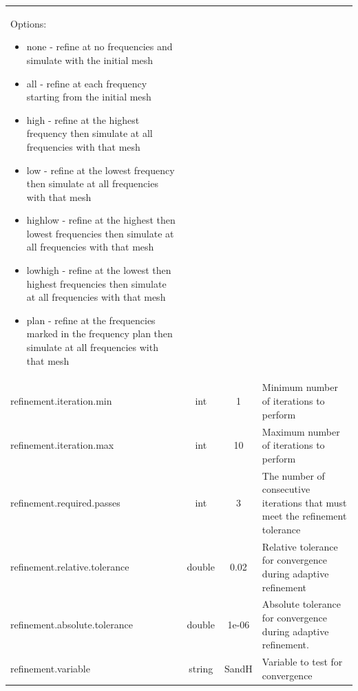 \documentclass[titlepage]{article}
\renewcommand\_{\textunderscore\linebreak[1]}
\begin{document}
\begin{longtable}[c]{|lccp{8cm}|}
                                                   Options: 
                                                   \begin{itemize}[nosep]
                                                     \item none    - refine at no frequencies and simulate with the initial mesh
                                                     \item all     - refine at each frequency starting from the initial mesh
                                                     \item high    - refine at the highest frequency then simulate at all frequencies with that mesh
                                                     \item low     - refine at the lowest frequency then simulate at all frequencies with that mesh
                                                     \item highlow - refine at the highest then lowest frequencies then simulate at all frequencies with that mesh
                                                     \item lowhigh - refine at the lowest then highest frequencies then simulate at all frequencies with that mesh
                                                     \item plan    - refine at the frequencies marked in the frequency plan then simulate at all frequencies with that mesh
                                                   \end{itemize}\\ 
    refinement.iteration.min      & int    & 1      &  Minimum number of iterations to perform \\
    refinement.iteration.max      & int    & 10     &  Maximum number of iterations to perform \\
    refinement.required.passes    & int    & 3      &  The number of consecutive iterations that must meet the refinement tolerance \\
    refinement.relative.tolerance & double & 0.02   & Relative tolerance for convergence during adaptive refinement \\
    refinement.absolute.tolerance & double & 1e-06  & Absolute tolerance for convergence during adaptive refinement. \\
    refinement.variable           & string & SandH  & Variable to test for convergence


\end{longtable}
\end{document}
